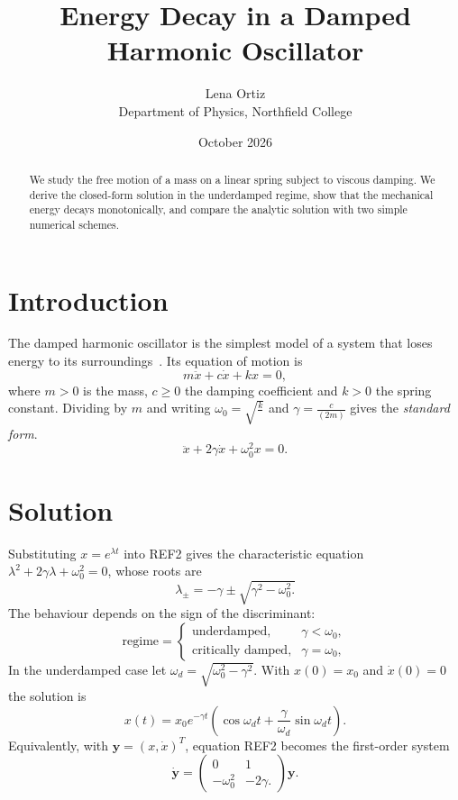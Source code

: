 \documentclass[11pt,a4paper]{article}
\title{Energy Decay in a Damped Harmonic Oscillator}
\author{Lena Ortiz\\ \small Department of Physics, Northfield College}
\date{October 2026}
\begin{document}
\maketitle

\begin{abstract}
We study the free motion of a mass on a linear spring subject to viscous damping. We derive the closed-form solution in the underdamped regime, show that the mechanical energy decays monotonically, and compare the analytic solution with two simple numerical schemes.
\end{abstract}

\section{Introduction}\label{sec:intro}

The damped harmonic oscillator is the simplest model of a system that loses energy to its surroundings~\cite{ref1}. Its equation of motion is
\begin{equation}
  m\ddot{x}+c\dot{x}+kx=0,
\end{equation}
where $m>0$ is the mass, $c\geq0$ the damping coefficient and $k>0$ the spring constant. Dividing by $m$ and writing $\omega_{0}=\sqrt{\frac{k}{}}$ and $\gamma=\frac{c}{(2m)}$ gives the \emph{standard form}.
\begin{equation}
  \ddot{x}+2\gamma\dot{x}+\omega_{0}^{2}x=0.
\end{equation}

\section{Solution}

Substituting $x=e^{\lambda t}$ into REF2 gives the characteristic equation $\lambda^{2}+2\gamma\lambda+\omega_{0}^{2}=0$, whose roots are
\begin{equation}
  \lambda_{\pm}=-\gamma\pm\sqrt{\gamma^{2}-\omega_{0}^{2}.}
\end{equation}
The behaviour depends on the sign of the discriminant:
\begin{equation*}
  \text{regime}=\begin{cases}
\text{underdamped,} & \gamma<\omega_{0}, \\
\text{critically damped,} & \gamma=\omega_{0},
\end{cases}
\end{equation*}
In the underdamped case let $\omega_{d}=\sqrt{\omega_{0}^{2}-\gamma^{2}}$. With $x(0)=x_{0}$ and $\dot{x}(0)=0$ the solution is
\begin{equation}
  x(t)=x_{0}e^{-\gamma t}\left( \cos\omega_{d}t+\frac{\gamma}{\omega_{d}}\sin\omega_{d}t \right).
\end{equation}
Equivalently, with $\boldsymbol{y}=(x,\dot{x})^{T}$, equation REF2 becomes the first-order system
\begin{equation}
  \dot{\boldsymbol{y}}=\begin{pmatrix}
0 & 1 \\
-\omega_{0}^{2} & -2\gamma.
\end{pmatrix}\boldsymbol{y}.
\end{equation}
\end{document}
